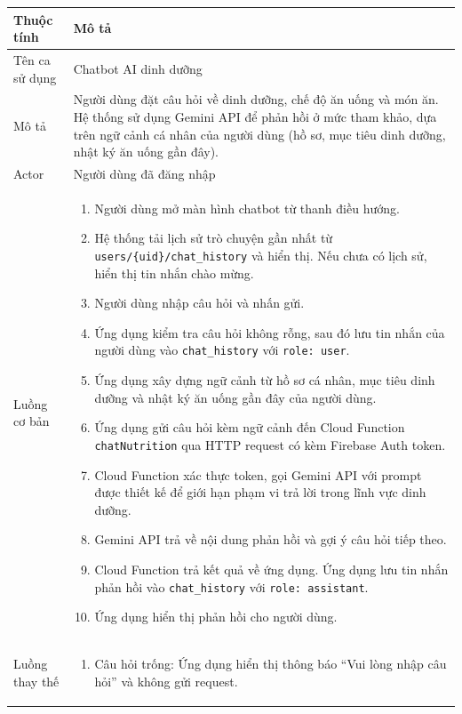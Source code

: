 \begin{longtable}{|p{4cm}|p{11cm}|}
    \hline
    \textbf{Thuộc tính} & \textbf{Mô tả} \\
    \hline
    \endhead
    \hline
    \endfoot
    Tên ca sử dụng & Chatbot AI dinh dưỡng \\
    \hline
    Mô tả & Người dùng đặt câu hỏi về dinh dưỡng, chế độ ăn uống và món ăn. Hệ thống sử dụng Gemini API để phản hồi ở mức tham khảo, dựa trên ngữ cảnh cá nhân của người dùng (hồ sơ, mục tiêu dinh dưỡng, nhật ký ăn uống gần đây). \\
    \hline
    Actor & Người dùng đã đăng nhập \\
    \hline
    Luồng cơ bản &
        \begin{enumerate}[nosep]
            \item Người dùng mở màn hình chatbot từ thanh điều hướng.
            \item Hệ thống tải lịch sử trò chuyện gần nhất từ \texttt{users/\{uid\}/chat\_history} và hiển thị. Nếu chưa có lịch sử, hiển thị tin nhắn chào mừng.
            \item Người dùng nhập câu hỏi và nhấn gửi.
            \item Ứng dụng kiểm tra câu hỏi không rỗng, sau đó lưu tin nhắn của người dùng vào \texttt{chat\_history} với \texttt{role: user}.
            \item Ứng dụng xây dựng ngữ cảnh từ hồ sơ cá nhân, mục tiêu dinh dưỡng và nhật ký ăn uống gần đây của người dùng.
            \item Ứng dụng gửi câu hỏi kèm ngữ cảnh đến Cloud Function \texttt{chatNutrition} qua HTTP request có kèm Firebase Auth token.
            \item Cloud Function xác thực token, gọi Gemini API với prompt được thiết kế để giới hạn phạm vi trả lời trong lĩnh vực dinh dưỡng.
            \item Gemini API trả về nội dung phản hồi và gợi ý câu hỏi tiếp theo.
            \item Cloud Function trả kết quả về ứng dụng. Ứng dụng lưu tin nhắn phản hồi vào \texttt{chat\_history} với \texttt{role: assistant}.
            \item Ứng dụng hiển thị phản hồi cho người dùng.
        \end{enumerate} \\
    \hline
    Luồng thay thế &
        \begin{enumerate}[nosep]
            \item[3a.] Câu hỏi trống: Ứng dụng hiển thị thông báo ``Vui lòng nhập câu hỏi'' và không gửi request.

\end{enumerate}
\end{longtable}
